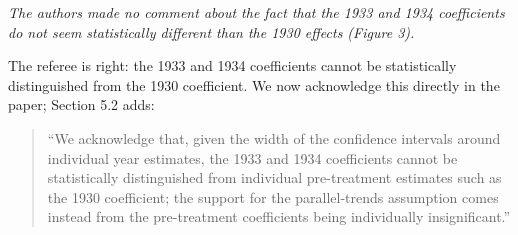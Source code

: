 \noindent \textit{\textcolor{red!60!black}{
The authors made no comment about the fact that the 1933 and 1934 coefficients do not seem statistically different than the 1930 effects (Figure 3).
}}

\bigskip

\noindent The referee is right: the 1933 and 1934 coefficients cannot be statistically distinguished from the 1930 coefficient. We now acknowledge this directly in the paper; Section 5.2 adds:

\begin{quote}
``We acknowledge that, given the width of the confidence intervals around individual year estimates, the 1933 and 1934 coefficients cannot be statistically distinguished from individual pre-treatment estimates such as the 1930 coefficient; the support for the parallel-trends assumption comes instead from the pre-treatment coefficients being individually insignificant.''
\end{quote}
